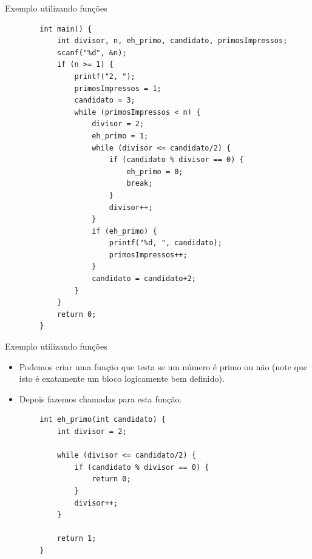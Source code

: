 \documentclass[handout]{beamer}
\begin{document}
\begin{frame}[fragile]{Exemplo utilizando funções}
    \begin{verbatim}
        int main() {
            int divisor, n, eh_primo, candidato, primosImpressos;
            scanf("%d", &n);
            if (n >= 1) {
                printf("2, ");
                primosImpressos = 1;
                candidato = 3;
                while (primosImpressos < n) {
                    divisor = 2;
                    eh_primo = 1;
                    while (divisor <= candidato/2) {
                        if (candidato % divisor == 0) {
                            eh_primo = 0;
                            break;
                        }
                        divisor++;
                    }
                    if (eh_primo) {
                        printf("%d, ", candidato);
                        primosImpressos++;
                    }
                    candidato = candidato+2; 
                }
            }
            return 0;
        }
    \end{verbatim} 
\end{frame}

\begin{frame}[fragile]{Exemplo utilizando funções}

    \begin{itemize}
        \item Podemos criar uma função que testa se um número é primo ou não (note que isto é exatamente um bloco logicamente bem definido).
        \item Depois fazemos chamadas para esta função.
    \end{itemize}

    \begin{verbatim}
        int eh_primo(int candidato) {
            int divisor = 2;

            while (divisor <= candidato/2) {
                if (candidato % divisor == 0) {
                    return 0;
                }
                divisor++;
            }

            return 1;
        }
    \end{verbatim} 
\end{frame}
\end{document}
